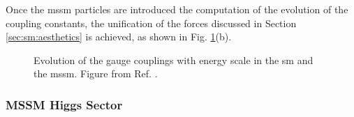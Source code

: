 Once the \gls{mssm} particles are introduced the computation of the evolution of the coupling constants, the unification of the forces discussed in Section \ref{sec:sm:aesthetics} is achieved, as shown in Fig. \ref{fig:susy:gut}(b).

\begin{figure}[ht]
\centering
{}
\caption{Evolution of the gauge couplings with energy scale in  the \gls{sm} and  the \gls{mssm}. Figure from Ref. \cite{Patrignani:2016xqp}.}
\label{fig:susy:gut}
\end{figure}

\subsubsection*{MSSM Higgs Sector}
\label{sec:susy:Higgs}

